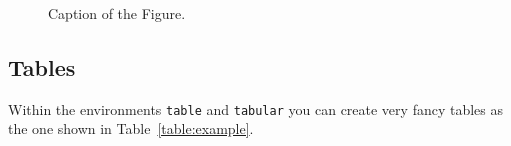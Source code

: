 \documentclass[11pt,a4paper]{article}
\begin{document}
        \begin{figure}[H]
            \centering
            \quad
            \caption[]{Caption of the Figure.}
            \label{fig:quadtree2}
        \end{figure}

    \subsection{Tables} \label{subsec:tables}

        Within the environments \texttt{table} and  \texttt{tabular} you can create very fancy tables as the one shown in Table~\ref{table:example}.
\end{document}
